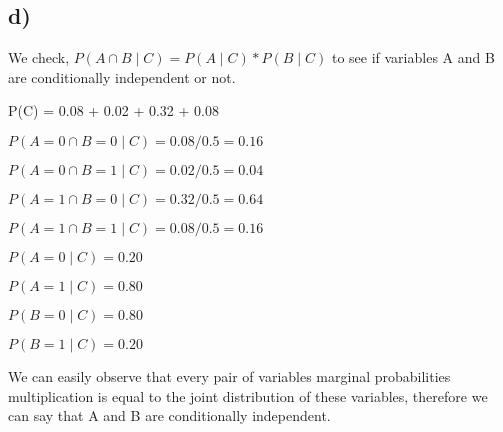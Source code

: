 \documentclass[12pt]{article}
\begin{document}
\subsection*{d)}
We check,
$P(A \cap B \mid C) = P(A \mid C) \ast P(B \mid C)$ to see if variables A and B are conditionally independent or not. \\ \par 
P(C) = 0.08 + 0.02 + 0.32 + 0.08 \\ \par 
$P(A=0 \cap B=0 \mid C) = 0.08/0.5 = 0.16$\\ \par 
$P(A=0 \cap B=1 \mid C) = 0.02/0.5 = 0.04$\\ \par 
$P(A=1 \cap B=0 \mid C) = 0.32/0.5 = 0.64$\\ \par
$P(A=1 \cap B=1 \mid C) = 0.08/0.5 = 0.16$\\ \par
$P(A=0 \mid C) = 0.20$\\ \par
$P(A=1 \mid C) = 0.80$\\ \par
$P(B=0 \mid C) = 0.80$\\ \par
$P(B=1 \mid C) = 0.20$\\ \par 
We can easily observe that every pair of variables marginal probabilities multiplication is equal to the joint distribution of these variables, therefore we can say that A and B are conditionally independent.
\end{document}
